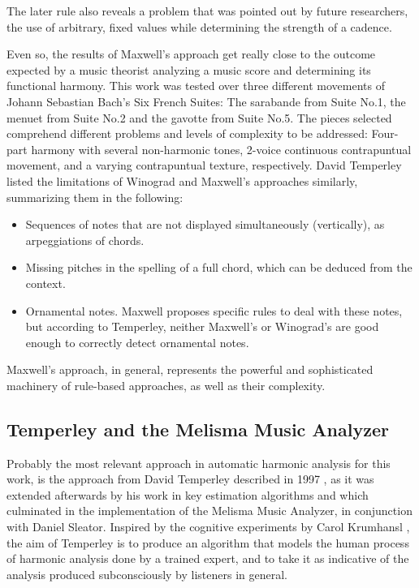 The later rule also reveals a problem that was pointed out
by future researchers, the use of arbitrary, fixed values
while determining the strength of a cadence.

Even so, the results of Maxwell's approach get really close
    to the outcome expected by a music theorist analyzing a
    music score and determining its functional harmony. This
    work was tested over three different movements of Johann
    Sebastian Bach's Six French Suites: The sarabande from
    Suite No.1, the menuet from Suite No.2 and the gavotte
    from Suite No.5. The pieces selected comprehend
    different problems and levels of complexity to be
    addressed: Four-part harmony with several non-harmonic
    tones, 2-voice continuous contrapuntual movement, and a
    varying contrapuntual texture, respectively. David
    Temperley listed the limitations of Winograd and
    Maxwell's approaches similarly, summarizing them in the
    following: \begin{itemize} \item Sequences of notes that
    are not displayed simultaneously (vertically), as
    arpeggiations of chords. \item Missing pitches in the
    spelling of a full chord, which can be deduced from the
    context. \item Ornamental notes. Maxwell proposes
    specific rules to deal with these notes, but according
    to Temperley, neither Maxwell's or Winograd's are good
    enough to correctly detect ornamental notes.
    \end{itemize} Maxwell's approach, in general, represents
    the powerful and sophisticated machinery of rule-based
    approaches, as well as their complexity.



\subsection{Temperley and the Melisma Music Analyzer}
Probably the most relevant approach in automatic harmonic
analysis for this work, is the approach from David Temperley
described in 1997 \cite{temperley1997algorithm}, as it was
extended afterwards by his work in key estimation algorithms
and which culminated in the implementation of the Melisma
Music Analyzer, in conjunction with Daniel Sleator. Inspired
by the cognitive experiments by Carol Krumhansl
\cite{krumhansl2001cognitive}, the aim of Temperley is to
produce an algorithm that models the human process of
harmonic analysis done by a trained expert, and to take it
as indicative of the analysis produced subconsciously by
listeners in general.

